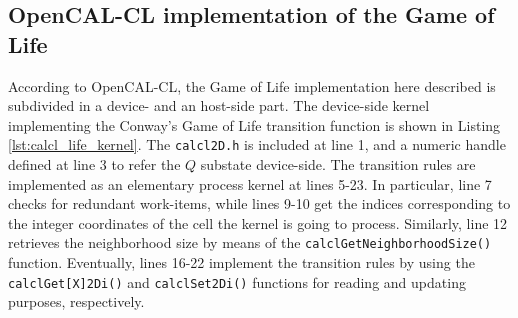 \subsection{OpenCAL-CL implementation of the Game of Life}
According to OpenCAL-CL, the Game of Life implementation here
described is subdivided in a device- and an host-side part. The
device-side kernel implementing the Conway's Game of Life
transition function is shown in Listing
\ref{lst:calcl_life_kernel}. The \verb'calcl2D.h' is included at
line 1, and a numeric handle defined at line 3 to refer the $Q$
substate device-side. The transition rules are implemented as an
elementary process kernel at lines 5-23. In particular, line 7
checks for redundant work-items, while lines 9-10 get the
indices corresponding to the integer coordinates of the cell the
kernel is going to process. Similarly, line 12 retrieves the
neighborhood size by means of the
\verb'calclGetNeighborhoodSize()' function. Eventually, lines
16-22 implement the transition rules by using the
\verb'calclGet[X]2Di()' and \verb'calclSet2Di()' functions for
reading and updating purposes, respectively.



